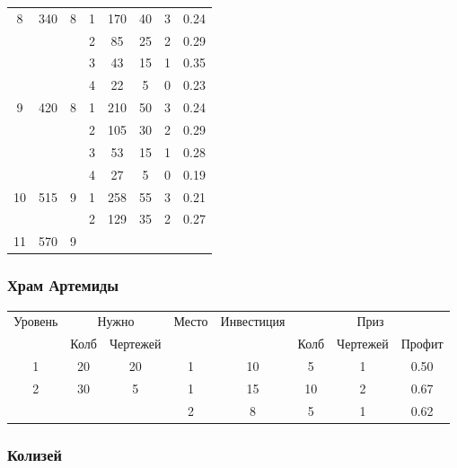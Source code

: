 \begin{longtable}[c]{|c|c|c|c|c|c|c|c|}
    \multirow{4}{*}{8} & \multirow{4}{*}{340} & \multirow{4}{*}{8} & 1 & 170 & 40 & 3 & 0.24 \\\cline{4-8}
    & & & 2 & 85 & 25 & 2 & 0.29 \\\cline{4-8}
    & & & 3 & 43 & 15 & 1 & 0.35 \\\cline{4-8}
    & & & 4 & 22 & 5 & 0 & 0.23 \\\hline
    \multirow{4}{*}{9} & \multirow{4}{*}{420} & \multirow{4}{*}{8} & 1 & 210 & 50 & 3 & 0.24 \\\cline{4-8}
    & & & 2 & 105 & 30 & 2 & 0.29 \\\cline{4-8}
    & & & 3 & 53 & 15 & 1 & 0.28 \\\cline{4-8}
    & & & 4 & 27 & 5 & 0 & 0.19 \\\hline
    \multirow{2}{*}{10} & \multirow{2}{*}{515} & \multirow{2}{*}{9} & 1 & 258 & 55 & 3 & 0.21 \\\cline{4-8}
    & & & 2 & 129 & 35 & 2 & 0.27 \\\hline
    \multirow{1}{*}{11} & \multirow{1}{*}{570} & \multirow{1}{*}{9} & & & & & \\\hline
\end{longtable}


\subsubsection{Храм Артемиды}

\begin{longtable}[c]{|c|c|c|c|c|c|c|c|}
    \hline
    \multirow{ 2}{*}{\small Уровень} &
    \multicolumn{2}{|c|}{\small Нужно} &
    \multirow{ 2}{*}{\small Место} & 
    \multirow{ 2}{*}{\small Инвестиция} & 
    \multicolumn{3}{|c|}{\small Приз} \\\cline{2-3}\cline{6-8}
    &
    {\small Колб} & 
    {\small Чертежей} & 
    & &
    {\small Колб} & 
    {\small Чертежей} & 
    {\small Профит}
    \\\hline\endhead
    \multirow{1}{*}{1} & \multirow{1}{*}{20} & \multirow{1}{*}{20} & 1 & 10 & 5 & 1 & 0.50 \\\hline
    \multirow{2}{*}{2} & \multirow{2}{*}{30} & \multirow{2}{*}{5} & 1 & 15 & 10 & 2 & 0.67 \\\cline{4-8}
    & & & 2 & 8 & 5 & 1 & 0.62 \\\hline
\end{longtable}


\subsubsection{Колизей}

